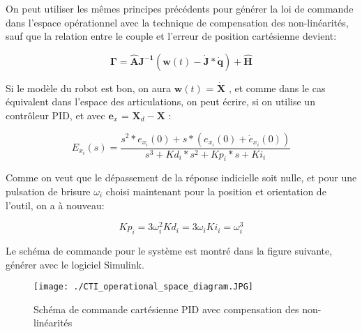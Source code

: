 On peut utiliser les mêmes principes précédents pour générer la loi de commande dans l'espace opérationnel avec la technique de compensation des non-linéarités, sauf que la relation entre le couple et l'erreur de position cartésienne devient:

\begin{equation}
	\bm{\Gamma} = \bm{\hat{A}}\bm{J^{-1}}(\bm{w}(t) - \bm{\dot{J}}*\dot{\bm{q}}) + \hat{\bm{H}}
\end{equation}


Si le modèle du robot est bon, on aura $ \bm{w}(t)$ = $ \dot{\bm{X}} $
, et comme dans le cas équivalent dans l'espace des articulations, on peut écrire, si on utilise un contrôleur PID, et avec $ \bm{e}_x $ = $ \bm{X}_d - \bm{X} $
:

\begin{equation}
	E_{x_i}(s)= \frac{s^2*e_{x_i}(0) + s*(e_{x_i}(0) + \dot{e}_{x_i}(0))}{s^3 + Kd_i*s^2 + Kp_i*s + Ki_i}
\end{equation}


Comme on veut que le dépassement de la réponse indicielle soit nulle, et pour une pulsation de brisure $ \omega_i $
 choisi maintenant pour la position et orientation de l'outil, on a à nouveau:

\begin{subequations}
	\begin{equation}
		Kp_i = 3\omega_i^2
	\end{equation}
	\begin{equation}
		Kd_i = 3\omega_i
	\end{equation}
	\begin{equation}
		Ki_i = \omega_i^3
	\end{equation}
\end{subequations}

Le schéma de commande pour le système est montré dans la figure suivante, générer avec le logiciel Simulink.

\begin{figure}[H]
	\begin{center}	
		\texttt{[image: ./CTI\_operational\_space\_diagram.JPG]}
		\caption{Schéma de commande cartésienne PID avec compensation des non-linéarités}
		\label{fig:CTI_operational_space_diagram}
	\end{center}
\end{figure}
